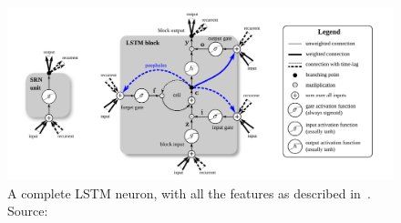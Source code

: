 \begin{figure}[H]
	\centering
	\includegraphics[width=0.9\linewidth]{figures/lstmneuron.png}
    \caption{A complete LSTM neuron, with all the features as described in~\cite{Graves05}. Source:~\cite{Greff15}}
	\label{fig:lstmneuron}
\end{figure}

